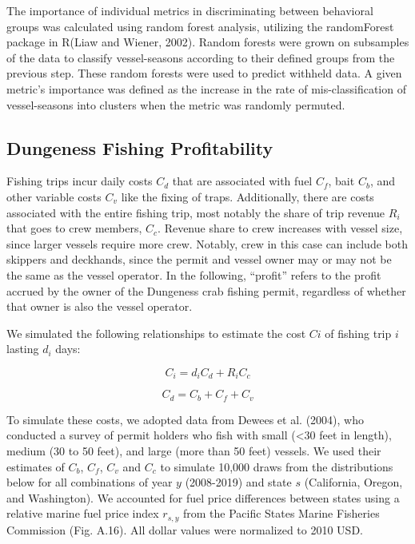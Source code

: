 \documentclass[]{elsarticle} %
\begin{document}
The importance of individual metrics in discriminating between
behavioral groups was calculated using random forest analysis, utilizing
the randomForest package in R(Liaw and Wiener, 2002). Random forests
were grown on subsamples of the data to classify vessel-seasons
according to their defined groups from the previous step. These random
forests were used to predict withheld data. A given metric's importance
was defined as the increase in the rate of mis-classification of
vessel-seasons into clusters when the metric was randomly permuted.

\hypertarget{dungeness-fishing-profitability}{%
\subsection{Dungeness Fishing
Profitability}\label{dungeness-fishing-profitability}}

Fishing trips incur daily costs \(C_d\) that are associated with fuel
\(C_f\), bait \(C_b\), and other variable costs \(C_v\) like the fixing
of traps. Additionally, there are costs associated with the entire
fishing trip, most notably the share of trip revenue \(R_i\) that goes
to crew members, \(C_c\). Revenue share to crew increases with vessel
size, since larger vessels require more crew. Notably, crew in this case
can include both skippers and deckhands, since the permit and vessel
owner may or may not be the same as the vessel operator. In the
following, ``profit'' refers to the profit accrued by the owner of the
Dungeness crab fishing permit, regardless of whether that owner is also
the vessel operator.

We simulated the following relationships to estimate the cost \(Ci\) of
fishing trip \(i\) lasting \(d_i\) days:

\begin{equation}
  C_i = d_iC_d + R_iC_c 
\end{equation}

\begin{equation}
  C_d = C_b + C_f + C_v
\end{equation}

To simulate these costs, we adopted data from Dewees et al. (2004), who
conducted a survey of permit holders who fish with small (\textless30
feet in length), medium (30 to 50 feet), and large (more than 50 feet)
vessels. We used their estimates of \(C_b\), \(C_f\), \(C_v\) and
\(C_c\) to simulate 10,000 draws from the distributions below for all
combinations of year \(y\) (2008-2019) and state \(s\) (California,
Oregon, and Washington). We accounted for fuel price differences between
states using a relative marine fuel price index \(r_{s,y}\) from the
Pacific States Marine Fisheries Commission (Fig. A.16). All dollar
values were normalized to 2010 USD.
\end{document}
